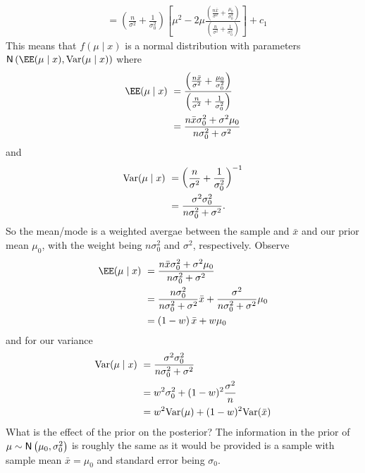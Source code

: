 \begin{exam}
\begin{align*}
         & = \left( \frac{n}{\sigma^2} + \frac{1}{\sigma_0^2} \right) \left[ \mu^2 - 2 \mu \frac{\left( \frac{n \bar{x}}{\sigma^2} + \frac{\mu_0}{\sigma_0^2} \right)}{\left( \frac{n}{\sigma^2} + \frac{1}{\sigma_0^2} \right)} \right] + c_1
    \end{align*}
    This means that $f(\mu \mid x)$ is a normal distribution with parameters $\Nor \left( \EE (\mu \mid x) , \Var (\mu \mid x) \right)$ where
    \begin{align*}
        \EE (\mu \mid x) \
         & = \frac{\left( \frac{n \bar{x}}{\sigma^2} + \frac{\mu_0}{\sigma_0^2} \right)}{\left( \frac{n}{\sigma^2} + \frac{1}{\sigma_0^2} \right)} \\
         & = \frac{n \bar{x} \sigma_0^2 + \sigma^2 \mu_0}{n \sigma_0^2 + \sigma^2}
    \end{align*}
    and
    \begin{align*}
        {\operatorname{Var}} (\mu \mid x) \
         & = \left( \frac{n}{\sigma^2} + \frac{1}{\sigma_0^2} \right)^{-1} \\
         & = \frac{\sigma^2 \sigma_0^2}{n \sigma_0^2 + \sigma^2}.
    \end{align*}
    So the mean/mode is a weighted avergae between the sample and $\bar{x}$ and our prior mean $\mu_0$, with the weight being $n \sigma_0^2$ and $\sigma^2$, respectively. Observe
    \begin{align*}
        \EE (\mu \mid x) \
         & = \frac{n \bar{x} \sigma_0^2 + \sigma^2 \mu_0}{n \sigma_0^2 + \sigma^2}                                 \\
         & = \frac{n \sigma_0^2}{n \sigma_0^2 + \sigma^2} \bar{x} + \frac{\sigma^2}{n \sigma_0^2 + \sigma^2} \mu_0 \\
         & = \left( 1 - w \right) \bar{x} + w \mu_0
    \end{align*}
    and for our variance
    \begin{align*}
        {\operatorname{Var}} (\mu \mid x) \
         & = \frac{\sigma^2 \sigma_0^2}{n \sigma_0^2 + \sigma^2} \\
         & = w^2 \sigma_0^2 + (1- w)^2 \frac{\sigma^2}{n}        \\
         & = w^2 {\operatorname{Var}} (\mu) + (1- w)^2 {\operatorname{Var}} (\bar{x})
    \end{align*}
    What is the effect of the prior on the posterior? The information in the prior of $\mu \sim {\sf N} \left( \mu_0 , \sigma_0^2 \right)$ is roughly the same as it would be provided is a sample with sample mean $\bar{x} = \mu_0$ and standard error being $\sigma_0$.
\end{exam}

